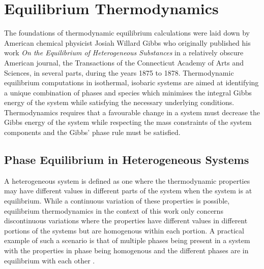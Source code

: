 \chapter{Equilibrium Thermodynamics} \label{chap:equilibrium}

	The foundations of thermodynamic equilibrium calculations were laid down by American chemical physicist Josiah Willard Gibbs who originally published his work \emph{On the Equilibrium of Heterogeneous Substances} in a relatively obscure American journal, the Transactions of the Connecticut Academy of Arts and Sciences, in several parts, during the years 1875 to 1878. Thermodynamic equilibrium computations in isothermal, isobaric systems are aimed at identifying a unique combination of phases and species which minimises the integral Gibbs energy of the system while satisfying the necessary underlying conditions. Thermodynamics requires that a favourable change in a system must decrease the Gibbs energy of the system while respecting the mass constraints of the system components and the Gibbs' phase rule must be satisfied.
	
\section{Phase Equilibrium in Heterogeneous Systems} \label{sec:multi_eqb}
	A heterogeneous system is defined as one where the thermodynamic properties may have different values in different parts of the system when the system is at equilibrium. While a continuous variation of these properties is possible, equilibrium thermodynamics in the context of this work only concerns discontinuous variations where the properties have different values in different portions of the systems but are homogenous within each portion. A practical example of such a scenario is that of multiple phases being present in a system with the properties in phase being homogenous and the different phases are in equilibrium with each other \cite{liu_wang_2016}.
	
